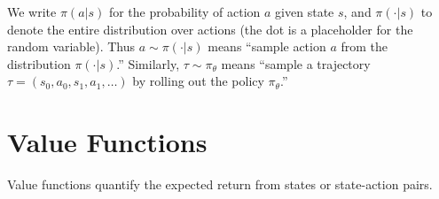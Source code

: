 \begin{remark}[Notation]
    We write $\pi(a|s)$ for the probability of action $a$ given state $s$, and $\pi(\cdot|s)$ to denote the entire distribution over actions (the dot is a placeholder for the random variable). Thus $a \sim \pi(\cdot|s)$ means ``sample action $a$ from the distribution $\pi(\cdot|s)$.'' Similarly, $\tau \sim \pi_\theta$ means ``sample a trajectory $\tau = (s_0, a_0, s_1, a_1, \ldots)$ by rolling out the policy $\pi_\theta$.''
\end{remark}

\section{Value Functions}

Value functions quantify the expected return from states or state-action pairs.

